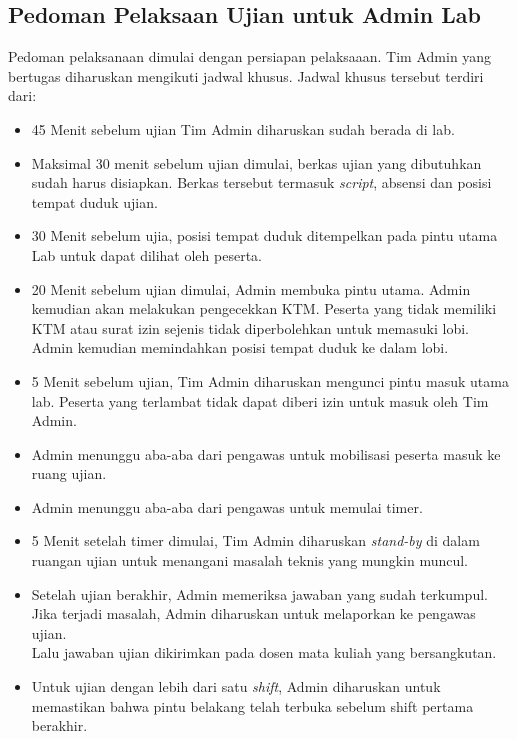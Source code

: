 \subsection{Pedoman Pelaksaan Ujian untuk Admin Lab}
    Pedoman pelaksanaan dimulai dengan persiapan pelaksaaan. Tim Admin yang
    bertugas diharuskan mengikuti jadwal khusus. Jadwal khusus tersebut terdiri
    dari:
    \begin{itemize}
        \item 45 Menit sebelum ujian Tim Admin diharuskan sudah berada di lab.
        \item Maksimal 30 menit sebelum ujian dimulai, berkas ujian yang
            dibutuhkan sudah harus disiapkan. Berkas tersebut termasuk
            \textit{script}, absensi dan posisi tempat duduk ujian. 
        \item 30 Menit sebelum ujia, posisi tempat duduk ditempelkan pada pintu
            utama Lab untuk dapat dilihat oleh peserta.
        \item 20 Menit sebelum ujian dimulai, Admin membuka pintu utama. Admin
            kemudian akan melakukan pengecekkan KTM. Peserta yang tidak memiliki
            KTM atau surat izin sejenis tidak diperbolehkan untuk memasuki
            lobi. \\
            Admin kemudian memindahkan posisi tempat duduk ke dalam lobi.
        \item 5 Menit sebelum ujian, Tim Admin diharuskan mengunci pintu masuk
            utama lab. Peserta yang terlambat tidak dapat diberi izin untuk
            masuk oleh Tim Admin.
        \item Admin menunggu aba-aba dari pengawas untuk mobilisasi peserta
            masuk ke ruang ujian.
        \item Admin menunggu aba-aba dari pengawas untuk memulai timer.
        \item 5 Menit setelah timer dimulai, Tim Admin diharuskan
            \textit{stand-by} di dalam ruangan ujian untuk menangani masalah
            teknis yang mungkin muncul.
        \item Setelah ujian berakhir, Admin memeriksa jawaban yang sudah
            terkumpul. Jika terjadi masalah, Admin diharuskan untuk melaporkan
            ke pengawas ujian. \\
        Lalu jawaban ujian dikirimkan pada dosen mata kuliah yang bersangkutan.
        \item Untuk ujian dengan lebih dari satu \textit{shift}, Admin
            diharuskan untuk memastikan bahwa pintu belakang telah terbuka
            sebelum shift pertama berakhir.
    \end{itemize}

